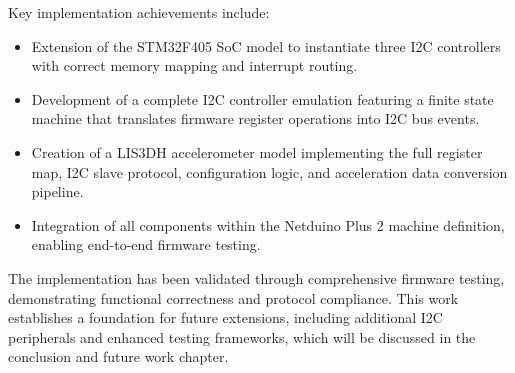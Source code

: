 Key implementation achievements include:

\begin{itemize}
\item Extension of the STM32F405 SoC model to instantiate three I2C controllers with correct memory mapping and interrupt routing.
\item Development of a complete I2C controller emulation featuring a finite state machine that translates firmware register operations into I2C bus events.
\item Creation of a LIS3DH accelerometer model implementing the full register map, I2C slave protocol, configuration logic, and acceleration data conversion pipeline.
\item Integration of all components within the Netduino Plus 2 machine definition, enabling end-to-end firmware testing.
\end{itemize}

The implementation has been validated through comprehensive firmware testing, demonstrating functional correctness and protocol compliance. This work establishes a foundation for future extensions, including additional I2C peripherals and enhanced testing frameworks, which will be discussed in the conclusion and future work chapter.
